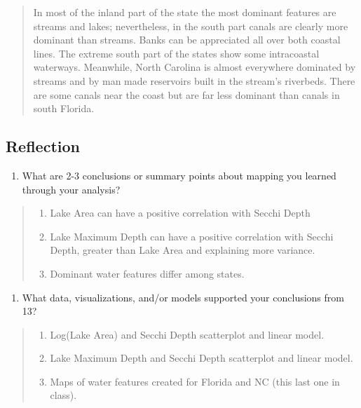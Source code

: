 \documentclass[]{article}
\providecommand{\tightlist}{%
  \setlength{\itemsep}{0pt}\setlength{\parskip}{0pt}}
\begin{document}
\begin{quote}
In most of the inland part of the state the most dominant features are
streams and lakes; nevertheless, in the south part canals are clearly
more dominant than streams. Banks can be appreciated all over both
coastal lines. The extreme south part of the states show some
intracoastal waterways. Meanwhile, North Carolina is almost everywhere
dominated by streams and by man made reservoirs built in the stream's
riverbeds. There are some canals near the coast but are far less
dominant than canals in south Florida.
\end{quote}

\hypertarget{reflection}{%
\subsection{Reflection}\label{reflection}}

\begin{enumerate}
\def\labelenumi{\arabic{enumi}.}
\setcounter{enumi}{12}
\tightlist
\item
  What are 2-3 conclusions or summary points about mapping you learned
  through your analysis?
\end{enumerate}

\begin{quote}
\begin{enumerate}
\def\labelenumi{\arabic{enumi}.}
\tightlist
\item
  Lake Area can have a positive correlation with Secchi Depth
\item
  Lake Maximum Depth can have a positive correlation with Secchi Depth,
  greater than Lake Area and explaining more variance.
\item
  Dominant water features differ among states.
\end{enumerate}
\end{quote}

\begin{enumerate}
\def\labelenumi{\arabic{enumi}.}
\setcounter{enumi}{13}
\tightlist
\item
  What data, visualizations, and/or models supported your conclusions
  from 13?
\end{enumerate}

\begin{quote}
\begin{enumerate}
\def\labelenumi{\arabic{enumi}.}
\tightlist
\item
  Log(Lake Area) and Secchi Depth scatterplot and linear model.
\item
  Lake Maximum Depth and Secchi Depth scatterplot and linear model.
\item
  Maps of water features created for Florida and NC (this last one in
  class).
\end{enumerate}
\end{quote}
\end{document}
